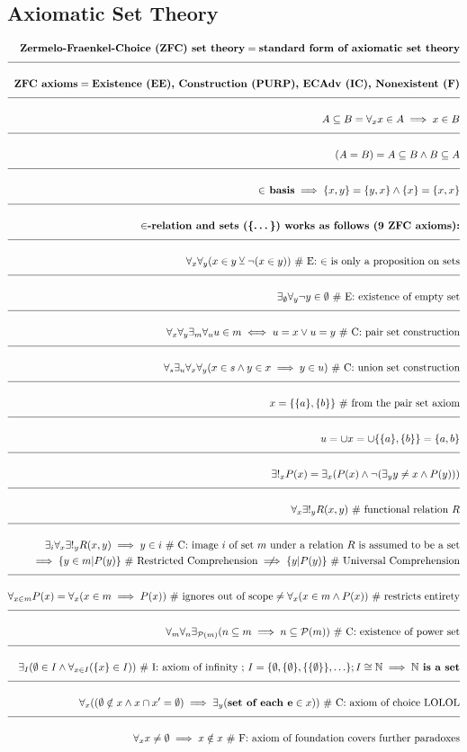 \documentclass[a4paper]{article}
\newcommand{\eqComment}[1]{\text{  \# #1}}
\newcommand{\eqSep}{\text{ ;  }}
\newcommand{\n}{\\[1.5ex] \hline \nonumber \\[0ex]}
\newcommand{\m}{\nonumber \\}
\begin{document}
\subsection{Axiomatic Set Theory}
\begin{tcolorbox}
\begin{align}
   \textbf{Zermelo-Fraenkel-Choice (ZFC) set theory} = \textbf{standard form of axiomatic set theory}
\n \textbf{ZFC axioms} = \textbf{Existence (EE), Construction (PURP), ECAdv (IC), Nonexistent (F)}
\n A \subseteq B = \forall_x x \in A \implies x \in B
\n (A = B) = A \subseteq B \land B \subseteq A
\n \textbf{$\in$ basis} \implies \{x, y\} = \{y, x\} \land \{x\} = \{x, x\}
\n \textbf{$\in$-relation and sets (\{\ldots\}) works as follows (9 ZFC axioms):}
\n \forall_x \forall_y (x \in y \veebar \lnot(x \in y)) \eqComment{E: $\in$ is only a proposition on sets}
\n \exists_\emptyset \forall_y \lnot y \in \emptyset \eqComment{E: existence of empty set}
\n \forall_x \forall_y \exists_m \forall_u u \in m \iff u = x \lor u = y \eqComment{C: pair set construction}
\n \forall_s \exists_u \forall_x \forall_y (x \in s \land y \in x \implies y \in u) \eqComment{C: union set construction}
\n x = \{\{a\}, \{b\}\} \eqComment{from the pair set axiom}
\n u = \cup x = \cup \{\{a\}, \{b\}\} = \{a, b\}
\n \exists!_x P(x) = \exists_x (P(x) \land \lnot (\exists_y y \neq x \land P(y))) 
\n \forall_x \exists!_y R(x,y) \eqComment{functional relation $R$}
\n \exists_i \forall_x \exists!_y R(x,y) \implies y \in i
\eqComment{C: image $i$ of set $m$ under a relation $R$ is assumed to be a set}
\m \implies \{y \in m | P(y)\} \eqComment{Restricted Comprehension} \centernot\implies  \{y | P(y)\} \eqComment{Universal Comprehension}
\n \forall_{x \in m} P(x) = \forall_x (x \in m \implies P(x)) \eqComment{ignores out of scope} \neq \forall_x (x \in m \land P(x)) \eqComment{restricts entirety}
\n \forall_m \forall_n \exists_{\mathcal{P}(m)} (n \subseteq m \implies n \subseteq \mathcal{P}(m)) \eqComment{C: existence of power set}
\n \exists_I (\emptyset \in I \land \forall_{x \in I} (\{x\} \in I)) \eqComment{I: axiom of infinity} \eqSep I = \{\emptyset, \{\emptyset\}, \{\{\emptyset\}\}, \ldots\} ; I \cong \mathbb{N} \implies \textbf{$\mathbb{N}$ is a set}
\n \forall_x ((\emptyset \notin x \land x \cap x' = \emptyset) \implies \exists_y (\textbf{set of each e} \in x)) \eqComment{C: axiom of choice LOLOL}
\n \forall_x x \neq \emptyset \implies x \notin x \eqComment{F: axiom of foundation covers further paradoxes}
\end{align}
\end{tcolorbox}
\end{document}
